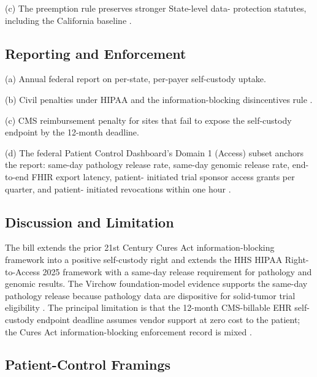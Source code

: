 (c) The preemption rule preserves stronger State-level data-
protection statutes, including the California baseline
\cite{kawchak_2026_19176370}.

\subsection{Reporting and Enforcement}

\hspace{0.5cm} (a) Annual federal report on per-state, per-payer self-custody
uptake.

(b) Civil penalties under HIPAA and the information-blocking disincentives rule
\cite{federal_register_info_blocking_disincentives_2024}.

(c) CMS reimbursement penalty for sites that fail to expose the
self-custody endpoint by the 12-month deadline.

(d) The federal Patient Control Dashboard's Domain 1 (Access)
subset anchors the report: same-day pathology release rate, same-day genomic release rate, end-to-end FHIR export latency, patient-
initiated trial sponsor access grants per quarter, and patient-
initiated revocations within one hour
\cite{hhs_right_to_access_2025, astp_onc_hospital_apis_2024}.

\subsection{Discussion and Limitation}

\hspace{0.5cm} The bill extends the prior 21st Century Cures Act information-blocking framework into a positive self-custody right and extends
the HHS HIPAA Right-to-Access 2025 framework with a same-day
release requirement for pathology and genomic results. The Virchow
foundation-model evidence supports the same-day pathology release
because pathology data are dispositive for solid-tumor trial
eligibility \cite{rank1_cures_act_2016, onc_cures_act_final_rule_page,
vorontsov2024virchow, hhs_right_to_access_2025}. The principal
limitation is that the 12-month CMS-billable EHR self-custody
endpoint deadline assumes vendor support at zero cost to the
patient; the Cures Act information-blocking enforcement record is
mixed \cite{federal_register_info_blocking_disincentives_2024}.

\subsection{Patient-Control Framings}

